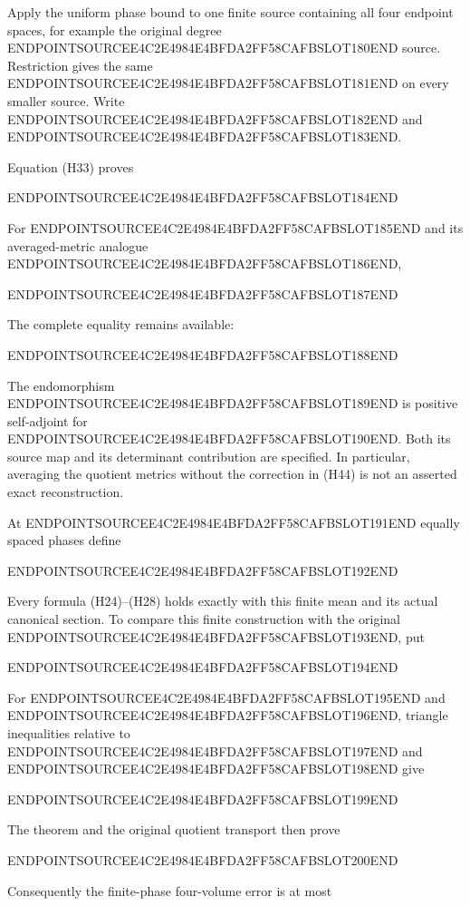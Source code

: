 Apply the uniform phase bound to one finite source containing all four endpoint spaces, for example the original degree ENDPOINTSOURCEE4C2E4984E4BFDA2FF58CAFBSLOT180END source. Restriction gives the same ENDPOINTSOURCEE4C2E4984E4BFDA2FF58CAFBSLOT181END on every smaller source. Write ENDPOINTSOURCEE4C2E4984E4BFDA2FF58CAFBSLOT182END and ENDPOINTSOURCEE4C2E4984E4BFDA2FF58CAFBSLOT183END.

Equation (H33) proves

ENDPOINTSOURCEE4C2E4984E4BFDA2FF58CAFBSLOT184END

For ENDPOINTSOURCEE4C2E4984E4BFDA2FF58CAFBSLOT185END and its averaged-metric analogue ENDPOINTSOURCEE4C2E4984E4BFDA2FF58CAFBSLOT186END,

ENDPOINTSOURCEE4C2E4984E4BFDA2FF58CAFBSLOT187END

The complete equality remains available:

ENDPOINTSOURCEE4C2E4984E4BFDA2FF58CAFBSLOT188END

The endomorphism ENDPOINTSOURCEE4C2E4984E4BFDA2FF58CAFBSLOT189END is positive self-adjoint for ENDPOINTSOURCEE4C2E4984E4BFDA2FF58CAFBSLOT190END. Both its source map and its determinant contribution are specified. In particular, averaging the quotient metrics without the correction in (H44) is not an asserted exact reconstruction.

At ENDPOINTSOURCEE4C2E4984E4BFDA2FF58CAFBSLOT191END equally spaced phases define

ENDPOINTSOURCEE4C2E4984E4BFDA2FF58CAFBSLOT192END

Every formula (H24)--(H28) holds exactly with this finite mean and its actual canonical section. To compare this finite construction with the original ENDPOINTSOURCEE4C2E4984E4BFDA2FF58CAFBSLOT193END, put

ENDPOINTSOURCEE4C2E4984E4BFDA2FF58CAFBSLOT194END

For ENDPOINTSOURCEE4C2E4984E4BFDA2FF58CAFBSLOT195END and ENDPOINTSOURCEE4C2E4984E4BFDA2FF58CAFBSLOT196END, triangle inequalities relative to ENDPOINTSOURCEE4C2E4984E4BFDA2FF58CAFBSLOT197END and ENDPOINTSOURCEE4C2E4984E4BFDA2FF58CAFBSLOT198END give

ENDPOINTSOURCEE4C2E4984E4BFDA2FF58CAFBSLOT199END

The theorem and the original quotient transport then prove

ENDPOINTSOURCEE4C2E4984E4BFDA2FF58CAFBSLOT200END

Consequently the finite-phase four-volume error is at most

